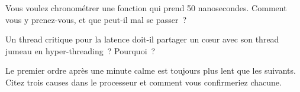 \begin{interviewq}\label{iq:ll:cpu-microarchitecture:4}
Vous voulez chronométrer une fonction qui prend 50 nanosecondes. Comment vous y prenez-vous, et que peut-il mal se passer~?
\end{interviewq}

\begin{interviewq}\label{iq:ll:cpu-microarchitecture:5}
Un thread critique pour la latence doit-il partager un cœur avec son thread jumeau en hyper-threading~? Pourquoi~?
\end{interviewq}

\begin{interviewq}\label{iq:ll:cpu-microarchitecture:6}
Le premier ordre après une minute calme est toujours plus lent que les suivants. Citez trois causes dans le processeur et
comment vous confirmeriez chacune.
\end{interviewq}
